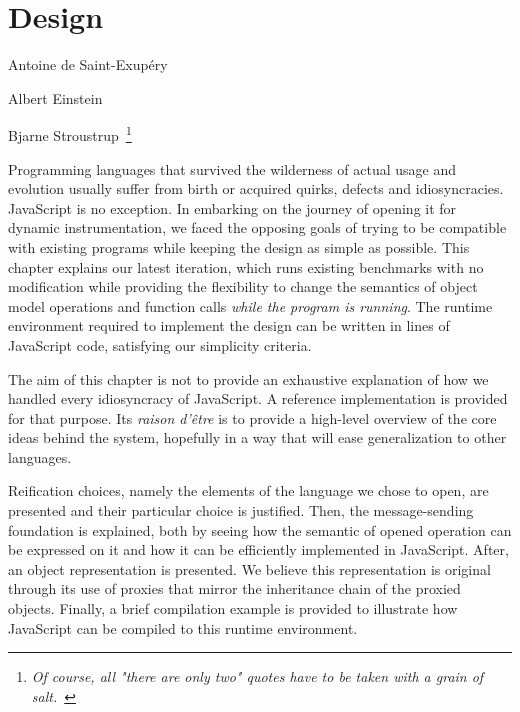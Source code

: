 \chapter{Design}
\label{chap:Design}
{Antoine de Saint-Exup\'ery}

{Albert Einstein}

{Bjarne Stroustrup~\footnote{\textit{Of course, all "there are only
two" quotes have to be taken with a grain of salt.}~\cite{stroustrup}}}

Programming languages that survived the wilderness of actual usage and
evolution usually suffer from birth or acquired quirks, defects and
idiosyncracies. JavaScript is no exception. In embarking on the journey of
opening it for dynamic instrumentation, we faced the opposing goals of trying
to be compatible with existing programs while keeping the design as simple as
possible. This chapter explains our latest iteration, which runs existing
benchmarks with no modification while providing the flexibility to change the
semantics of object model operations and function calls \textit{while the
program is running}. The runtime environment required to implement the design
can be written in  lines
of JavaScript code, satisfying our simplicity criteria.

The aim of this chapter is not to provide an exhaustive explanation of how we
handled every idiosyncracy of JavaScript. A reference implementation is
provided for that purpose. Its \textit{raison d'\^etre} is to provide a
high-level overview of the core ideas behind the system, hopefully in a way
that will ease generalization to other languages.

Reification choices, namely the elements of the language we chose to open, are
presented and their particular choice is justified. Then, the message-sending
foundation is explained, both by seeing how the semantic of opened operation
can be expressed on it and how it can be efficiently implemented in JavaScript.
After, an object representation is presented. We believe this representation is
original through its use of proxies that mirror the inheritance chain of the
proxied objects. Finally, a brief compilation example is provided to illustrate
how JavaScript can be compiled to this runtime environment.

